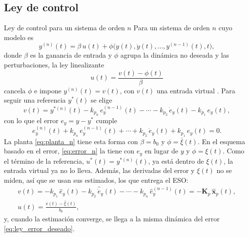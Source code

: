  
\subsection{Ley de control}
\label{subsec:ley}
 
\begin{recuadro}{Ley de control para un sistema de orden $n$}
Para un sistema de orden $n$ cuyo modelo es
\begin{equation}
y^{(n)}(t) = \beta\,u(t) + \phi\bigl(y(t), \dot{y}(t), \dots, y^{(n-1)}(t), t\bigr),
\end{equation}
donde $\beta$ es la ganancia de entrada y $\phi$ agrupa la dinámica no deseada y las
perturbaciones, la ley linealizante
\begin{equation}
u(t) = \frac{v(t) - \phi(t)}{\beta}
\end{equation}
cancela $\phi$ e impone $y^{(n)}(t) = v(t)$, con $v(t)$ una entrada virtual
\cite{sira2017adrc}. Para seguir una referencia $y^*(t)$ se elige
\begin{equation}
v(t) = y^{*(n)}(t) - k_{p_n}\,e_y^{(n-1)}(t) - \cdots - k_{p_2}\,\dot{e}_y(t) - k_{p_1}\,e_y(t),
\end{equation}
con lo que el error $e_y = y - y^*$ cumple
\begin{equation}
e_y^{(n)}(t) + k_{p_n}\,e_y^{(n-1)}(t) + \cdots + k_{p_2}\,\dot{e}_y(t) + k_{p_1}\,e_y(t) = 0 .
\label{eq:ley_error_deseado}
\end{equation}
La planta \eqref{eq:planta_n} tiene esta forma con $\beta = b_0$ y $\phi = \bar{\xi}(t)$. En el
esquema basado en el error, \eqref{eq:error_n} la tiene con $e_y$ en lugar de $y$ y $\phi = \xi(t)$.
Como el término de la referencia, $u^*(t) = y^{*(n)}(t)$, ya está dentro de $\xi(t)$, la entrada
virtual ya no lo lleva. Además, las derivadas del error y $\xi(t)$ no se miden, así que se usan
sus estimados, los que entrega el ESO:
\begin{equation}
\begin{gathered}
v(t) = -k_{p_1}\,\hat{e}_y(t) - k_{p_2}\,\hat{\dot{e}}_y(t) - \cdots - k_{p_n}\,\widehat{e}_y^{(n-1)}(t)
= -\mathbf{K}_p\,\hat{\mathbf{x}}_p(t),\\[4pt]
u(t) = \frac{v(t) - \hat{\xi}(t)}{b_0},
\end{gathered}
\end{equation}
y, cuando la estimación converge, se llega a la misma dinámica del error
\eqref{eq:ley_error_deseado}.
\end{recuadro}

